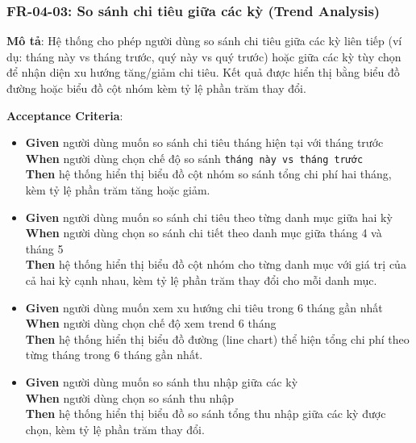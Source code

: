 \subsubsection{FR-04-03: So sánh chi tiêu giữa các kỳ (Trend Analysis)}

\textbf{Mô tả}: Hệ thống cho phép người dùng so sánh chi tiêu giữa các kỳ liên tiếp (ví dụ: tháng này vs tháng trước, quý này vs quý trước) hoặc giữa các kỳ tùy chọn để nhận diện xu hướng tăng/giảm chi tiêu. Kết quả được hiển thị bằng biểu đồ đường hoặc biểu đồ cột nhóm kèm tỷ lệ phần trăm thay đổi.



\textbf{Acceptance Criteria}:

\begin{itemize}
\item \textbf{Given} người dùng muốn so sánh chi tiêu tháng hiện tại với tháng trước  \\ \hspace*{1.5em}  \textbf{When} người dùng chọn chế độ so sánh \texttt{tháng này vs tháng trước}  \\ \hspace*{1.5em}  \textbf{Then} hệ thống hiển thị biểu đồ cột nhóm so sánh tổng chi phí hai tháng, kèm tỷ lệ phần trăm tăng hoặc giảm.
\item \textbf{Given} người dùng muốn so sánh chi tiêu theo từng danh mục giữa hai kỳ  \\ \hspace*{1.5em}  \textbf{When} người dùng chọn so sánh chi tiết theo danh mục giữa tháng 4 và tháng 5  \\ \hspace*{1.5em}  \textbf{Then} hệ thống hiển thị biểu đồ cột nhóm cho từng danh mục với giá trị của cả hai kỳ cạnh nhau, kèm tỷ lệ phần trăm thay đổi cho mỗi danh mục.
\item \textbf{Given} người dùng muốn xem xu hướng chi tiêu trong 6 tháng gần nhất  \\ \hspace*{1.5em}  \textbf{When} người dùng chọn chế độ xem trend 6 tháng  \\ \hspace*{1.5em}  \textbf{Then} hệ thống hiển thị biểu đồ đường (line chart) thể hiện tổng chi phí theo từng tháng trong 6 tháng gần nhất.
\item \textbf{Given} người dùng muốn so sánh thu nhập giữa các kỳ  \\ \hspace*{1.5em}  \textbf{When} người dùng chọn so sánh thu nhập  \\ \hspace*{1.5em}  \textbf{Then} hệ thống hiển thị biểu đồ so sánh tổng thu nhập giữa các kỳ được chọn, kèm tỷ lệ phần trăm thay đổi.

\end{itemize}
